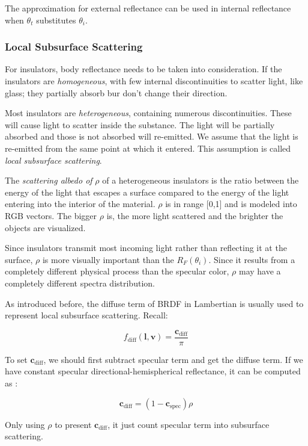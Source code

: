 \documentclass[10pt, a4paper]{article}
\begin{document}
            The approximation for external reflectance can be used in internal reflectance when $\theta_t$ substitutes $\theta_i$.

        \subsubsection{Local Subsurface Scattering}
            For insulators, body reflectance needs to be taken into consideration. If the insulators are \emph{homogeneous}, with few internal discontinuities to scatter light, like glass; they partially absorb bur don't change their direction. 

            Most insulators are \emph{heterogeneous}, containing numerous discontinuities. These will cause light to scatter inside the substance. The light will be partially absorbed and those is not absorbed will re-emitted. We assume that the light is re-emitted from the same point at which it entered. This assumption is called \emph{local subsurface scattering}.
            
            The \emph{scattering albedo of} $\rho$ of a heterogeneous insulators is the ratio between the energy of the light that escapes a surface compared to the energy of the light entering into the interior of the material. $\rho$ is in range [0,1] and is modeled into RGB vectors. The bigger $\rho$ is, the more light scattered and the brighter the objects are visualized. 
            
            Since insulators transmit most incoming light rather than reflecting it at the surface, $\rho$ is more visually important than the $R_F(\theta_i)$. Since it results from a completely different physical process than the specular color, $\rho$ may have a completely different spectra distribution. 

            As introduced before, the diffuse term of BRDF in Lambertian is usually used to represent local subsurface scattering. Recall:  

            $$f_{\text{diff}}(\textbf{l}, \textbf{v}) = \frac{\textbf{c}_{\text{diff}}}{\pi}$$

            To set $\textbf{c}_{\text{diff}}$, we should first subtract specular term and get the diffuse term. If we have constant specular directional-hemispherical reflectance, it can be computed as :

            $$\textbf{c}_{\text{diff}} = (1 - \textbf{c}_{\text{spec}})\rho$$

            Only using $\rho$ to present $\textbf{c}_{\text{diff}}$, it just count specular term into subsurface scattering. 
\end{document}
